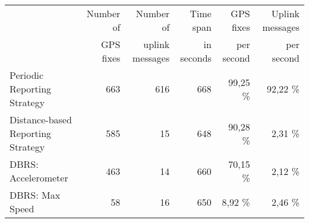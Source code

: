 \begin{table*}[!h]
\begin{tabular}{lrrrrr}

& Number of & Number of & Time span & GPS fixes & Uplink messages \\

& GPS fixes & uplink messages & in seconds & per second & per second \\

\hline

Periodic Reporting Strategy & 663 & 616 & 668 & 99,25 \% & 92,22 \% \\

\hline

Distance-based Reporting Strategy & 585 & 15 & 648 & 90,28 \% & 2,31 \% \\

\hline

DBRS: Accelerometer & 463 & 14 & 660 & 70,15 \% & 2,12 \% \\

\hline

DBRS: Max Speed & 58 & 16 & 650 & 8,92 \% & 2,46 \% \\

\hline

\end{tabular}
\end{table*}
